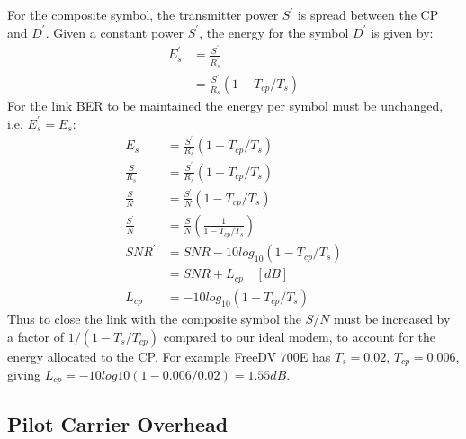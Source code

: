 \documentclass{article}
\begin{document}
For the composite symbol, the transmitter power $S^\prime$ is spread between the CP and $D^\prime$.  Given a constant power $S^\prime$, the energy for the symbol $D^\prime$ is given by:
\begin{equation}
\begin{split}
E^\prime_s &= \frac{S^\prime}{R^\prime_s}  \\
           &= \frac{S^\prime}{R_s}(1 - T_{cp}/T_s)
\end{split}
\end{equation}
For the link BER to be maintained the energy per symbol must be unchanged, i.e. $E^\prime_s=E_s$:
\begin{equation}
\begin{split}
E_s           &= \frac{S^\prime}{R_s}(1 - T_{cp}/T_s) \\
\frac{S}{R_s} &= \frac{S^\prime}{R_s}(1 - T_{cp}/T_s) \\
\frac{S}{N} &= \frac{S^\prime}{N}(1 - T_{cp}/T_s) \\
\frac{S^\prime}{N} &= \frac{S}{N}\left(\frac{1}{1 - T_{cp}/T_s}\right) \\
SNR^\prime  &= SNR - 10log_{10}(1-T_{cp}/T_s) \\
            &= SNR + L_{cp} \quad [\si{dB}] \\
     L_{cp} &= -10log_{10}(1-T_{cp}/T_s)    
\end{split}
\end{equation}
Thus to close the link with the composite symbol the $S/N$ must be increased by a factor of $1/(1 - {T_s}/T_{cp})$ compared to our ideal modem, to account for the energy allocated to the CP.  For example FreeDV 700E has $T_s=0.02$, $T_{cp}=0.006$, giving $L_{cp}=-10log10(1-0.006/0.02)=1.55 \si{dB}$.

\subsection{Pilot Carrier Overhead}
\end{document}
